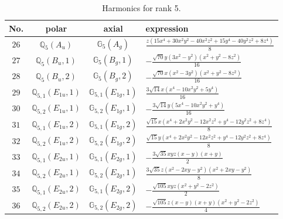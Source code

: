 \documentclass[fleqn,8pt,landscape]{jsarticle}
\begin{document}
\begin{table}[ht!]
\begin{center}
\caption{Harmonics for rank 5.}
\renewcommand{\arraystretch}{1.3}
\begin{tabular}{cccl} \hline \hline
No. & polar & axial & expression \\ \hline
$ 26 $ & $ \mathbb{Q}_{5}(A_{u}) $ & $ \mathbb{G}_{5}(A_{g}) $ & $ \frac{z \left(15 x^{4} + 30 x^{2} y^{2} - 40 x^{2} z^{2} + 15 y^{4} - 40 y^{2} z^{2} + 8 z^{4}\right)}{8} $ \\
$ 27 $ & $ \mathbb{Q}_{5}(B_{u},1) $ & $ \mathbb{G}_{5}(B_{g},1) $ & $ - \frac{\sqrt{70} y \left(3 x^{2} - y^{2}\right) \left(x^{2} + y^{2} - 8 z^{2}\right)}{16} $ \\
$ 28 $ & $ \mathbb{Q}_{5}(B_{u},2) $ & $ \mathbb{G}_{5}(B_{g},2) $ & $ - \frac{\sqrt{70} x \left(x^{2} - 3 y^{2}\right) \left(x^{2} + y^{2} - 8 z^{2}\right)}{16} $ \\
$ 29 $ & $ \mathbb{Q}_{5,1}(E_{1u},1) $ & $ \mathbb{G}_{5,1}(E_{1g},1) $ & $ \frac{3 \sqrt{14} x \left(x^{4} - 10 x^{2} y^{2} + 5 y^{4}\right)}{16} $ \\
$ 30 $ & $ \mathbb{Q}_{5,2}(E_{1u},1) $ & $ \mathbb{G}_{5,2}(E_{1g},1) $ & $ - \frac{3 \sqrt{14} y \left(5 x^{4} - 10 x^{2} y^{2} + y^{4}\right)}{16} $ \\
$ 31 $ & $ \mathbb{Q}_{5,1}(E_{1u},2) $ & $ \mathbb{G}_{5,1}(E_{1g},2) $ & $ \frac{\sqrt{15} x \left(x^{4} + 2 x^{2} y^{2} - 12 x^{2} z^{2} + y^{4} - 12 y^{2} z^{2} + 8 z^{4}\right)}{8} $ \\
$ 32 $ & $ \mathbb{Q}_{5,2}(E_{1u},2) $ & $ \mathbb{G}_{5,2}(E_{1g},2) $ & $ \frac{\sqrt{15} y \left(x^{4} + 2 x^{2} y^{2} - 12 x^{2} z^{2} + y^{4} - 12 y^{2} z^{2} + 8 z^{4}\right)}{8} $ \\
$ 33 $ & $ \mathbb{Q}_{5,1}(E_{2u},1) $ & $ \mathbb{G}_{5,1}(E_{2g},1) $ & $ - \frac{3 \sqrt{35} x y z \left(x - y\right) \left(x + y\right)}{2} $ \\
$ 34 $ & $ \mathbb{Q}_{5,2}(E_{2u},1) $ & $ \mathbb{G}_{5,2}(E_{2g},1) $ & $ \frac{3 \sqrt{35} z \left(x^{2} - 2 x y - y^{2}\right) \left(x^{2} + 2 x y - y^{2}\right)}{8} $ \\
$ 35 $ & $ \mathbb{Q}_{5,1}(E_{2u},2) $ & $ \mathbb{G}_{5,1}(E_{2g},2) $ & $ - \frac{\sqrt{105} x y z \left(x^{2} + y^{2} - 2 z^{2}\right)}{2} $ \\
$ 36 $ & $ \mathbb{Q}_{5,2}(E_{2u},2) $ & $ \mathbb{G}_{5,2}(E_{2g},2) $ & $ - \frac{\sqrt{105} z \left(x - y\right) \left(x + y\right) \left(x^{2} + y^{2} - 2 z^{2}\right)}{4} $ \\
 \hline \hline
\end{tabular}
\end{center}
\end{table}
\end{document}
